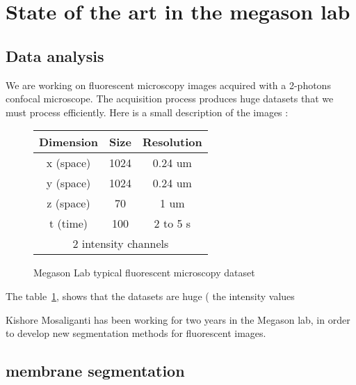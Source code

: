 \section{State of the art in the megason lab}


\subsection{Data analysis}

We are working on fluorescent microscopy images acquired with a 2-photons confocal microscope. The acquisition process produces huge datasets that we must process efficiently.
Here is a small description of the images :
\begin{figure}[htb]
\begin{center}
\begin{tabular}{|c|c|c|}
\hline Dimension & Size & Resolution \\ 
\hline x (space) & 1024 & 0.24 um \\ 
\hline y (space) & 1024 & 0.24 um \\ 
\hline z (space) & 70 & 1 um \\ 
\hline t (time) & 100 & 2 to 5 s \\ 
\hline \multicolumn{3}{|c|}{ 2 intensity channels} \\ 
\hline
\end{tabular} 
\end{center}
\caption{Megason Lab typical fluorescent microscopy dataset}
\label{tab:DataSizes}
\end{figure}
The table~\ref{tab:DataSizes}, shows that the datasets are huge ( the intensity values 





Kishore Mosaliganti has been working for two years in the Megason lab, in order to develop new segmentation methods for fluorescent images.

\subsection{membrane segmentation}









